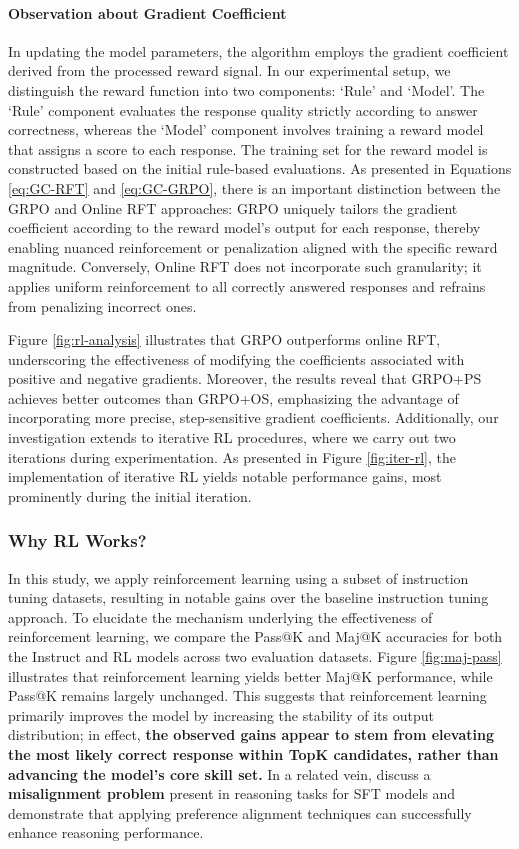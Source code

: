 \begin{itemize}[topsep=0pt]
\begin{itemize}[topsep=0pt]
\paragraph{Observation about Gradient Coefficient} In updating the model parameters, the algorithm employs the gradient coefficient derived from the processed reward signal. In our experimental setup, we distinguish the reward function into two components: `Rule' and `Model'. The `Rule' component evaluates the response quality strictly according to answer correctness, whereas the `Model' component involves training a reward model that assigns a score to each response. The training set for the reward model is constructed based on the initial rule-based evaluations. As presented in Equations \ref{eq:GC-RFT} and \ref{eq:GC-GRPO}, there is an important distinction between the GRPO and Online RFT approaches: GRPO uniquely tailors the gradient coefficient according to the reward model’s output for each response, thereby enabling nuanced reinforcement or penalization aligned with the specific reward magnitude. Conversely, Online RFT does not incorporate such granularity; it applies uniform reinforcement to all correctly answered responses and refrains from penalizing incorrect ones.

Figure \ref{fig:rl-analysis} illustrates that GRPO outperforms online RFT, underscoring the effectiveness of modifying the coefficients associated with positive and negative gradients. Moreover, the results reveal that GRPO+PS achieves better outcomes than GRPO+OS, emphasizing the advantage of incorporating more precise, step-sensitive gradient coefficients. Additionally, our investigation extends to iterative RL procedures, where we carry out two iterations during experimentation. As presented in Figure \ref{fig:iter-rl}, the implementation of iterative RL yields notable performance gains, most prominently during the initial iteration.

\subsubsection{Why RL Works?} In this study, we apply reinforcement learning using a subset of instruction tuning datasets, resulting in notable gains over the baseline instruction tuning approach. To elucidate the mechanism underlying the effectiveness of reinforcement learning, we compare the Pass@K and Maj@K accuracies for both the Instruct and RL models across two evaluation datasets. Figure \ref{fig:maj-pass} illustrates that reinforcement learning yields better Maj@K performance, while Pass@K remains largely unchanged. This suggests that reinforcement learning primarily improves the model by increasing the stability of its output distribution; in effect, \textbf{the observed gains appear to stem from elevating the most likely correct response within TopK candidates, rather than advancing the model’s core skill set.} In a related vein, \citep{wang2023making} discuss a \textbf{misalignment problem} present in reasoning tasks for SFT models and demonstrate that applying preference alignment techniques \citep{yuan2023rrhf,song2023preference,wang2023making} can successfully enhance reasoning performance.


\end{itemize}
\end{itemize}
